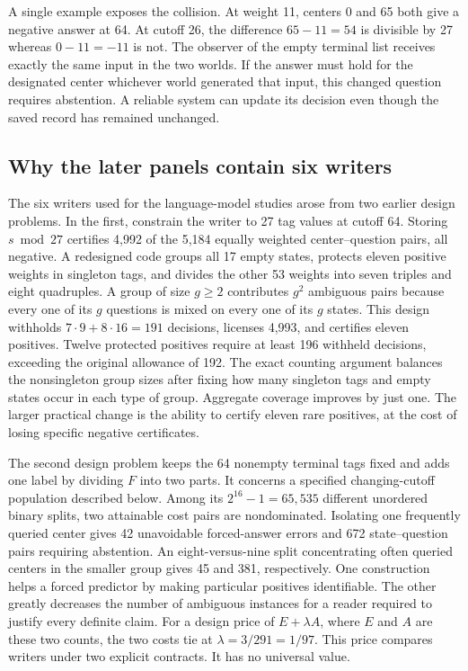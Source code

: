 \documentclass[12pt,letterpaper]{article}
\begin{document}
A single example exposes the collision. At weight 11, centers 0 and 65 both give a negative answer at 64. At cutoff 26, the difference \(65-11=54\) is divisible by 27 whereas \(0-11=-11\) is not. The observer of the empty terminal list receives exactly the same input in the two worlds. If the answer must hold for the designated center whichever world generated that input, this changed question requires abstention. A reliable system can update its decision even though the saved record has remained unchanged.

\subsection{Why the later panels contain six writers}

The six writers used for the language-model studies arose from two earlier design problems. In the first, constrain the writer to 27 tag values at cutoff 64. Storing \(s\bmod 27\) certifies 4,992 of the 5,184 equally weighted center--question pairs, all negative. A redesigned code groups all 17 empty states, protects eleven positive weights in singleton tags, and divides the other 53 weights into seven triples and eight quadruples. A group of size \(g\geq 2\) contributes \(g^2\) ambiguous pairs because every one of its \(g\) questions is mixed on every one of its \(g\) states. This design withholds \(7\cdot 9+8\cdot16=191\) decisions, licenses 4,993, and certifies eleven positives. Twelve protected positives require at least 196 withheld decisions, exceeding the original allowance of 192. The exact counting argument balances the nonsingleton group sizes after fixing how many singleton tags and empty states occur in each type of group. Aggregate coverage improves by just one. The larger practical change is the ability to certify eleven rare positives, at the cost of losing specific negative certificates.

The second design problem keeps the 64 nonempty terminal tags fixed and adds one label by dividing \(F\) into two parts. It concerns a specified changing-cutoff population described below. Among its \(2^{16}-1=65{,}535\) different unordered binary splits, two attainable cost pairs are nondominated. Isolating one frequently queried center gives 42 unavoidable forced-answer errors and 672 state--question pairs requiring abstention. An eight-versus-nine split concentrating often queried centers in the smaller group gives 45 and 381, respectively. One construction helps a forced predictor by making particular positives identifiable. The other greatly decreases the number of ambiguous instances for a reader required to justify every definite claim. For a design price of \(E+\lambda A\), where \(E\) and \(A\) are these two counts, the two costs tie at \(\lambda=3/291=1/97\). This price compares writers under two explicit contracts. It has no universal value.
\end{document}
